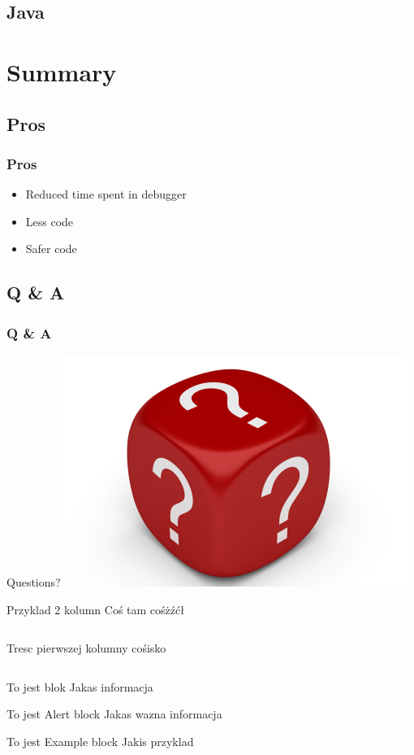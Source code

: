 \documentclass{beamer}
\begin{document}
\subsection{Java}

\section{Summary}
\subsection{Pros}
\begin{frame}
\frametitle{Pros}
\begin{itemize}
  \item Reduced time spent in debugger
  \item Less code
  \item Safer code
\end{itemize}
\end{frame}


\subsection{Q \& A}
\begin{frame}
\frametitle{Q \& A}
\begin{center}
\Huge Questions?
\includegraphics[scale=0.45]{dice_questions}
\end{center}
\end{frame}



\begin{frame}{Przyklad 2 kolumn}
Coś tam cośżźćł
\begin{columns}[t] %
Tresc pierwszej kolumny
cośisko
\end{columns}
\end{frame}

\begin{frame}
\begin{block}{To jest blok}
Jakas informacja
\end{block}

\begin{alertblock}{To jest Alert block}
Jakas wazna informacja
\end{alertblock}

\begin{exampleblock}{To jest Example block}
Jakis przyklad
\end{exampleblock}
\end{frame}

\end{document}
